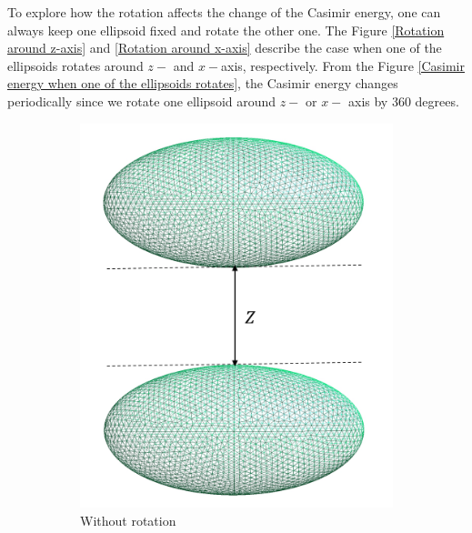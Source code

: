 To explore how the rotation affects the change of the Casimir energy, one can always keep one ellipsoid fixed and rotate the other one. The Figure 
\ref{Rotation around z-axis} and \ref{Rotation around x-axis} describe the case when one of the ellipsoids rotates around $z-$ and $x-$axis, respectively.
From the Figure \ref{Casimir energy when one of the ellipsoids rotates}, the Casimir energy changes periodically since we rotate one ellipsoid around 
$z-$ or $x-$ axis by 360 degrees. 


\begin{figure}[H]
    \begin{subfigure}{\linewidth}
        \centering
        \includegraphics[scale = 0.4]{figures/two_ellipsoids}
        \caption{Without rotation}
        \label{Without rotation}
        \end{subfigure}\\[1ex]
    \begin{subfigure}{.5\linewidth}
    \centering

\end{subfigure}
\end{figure}
